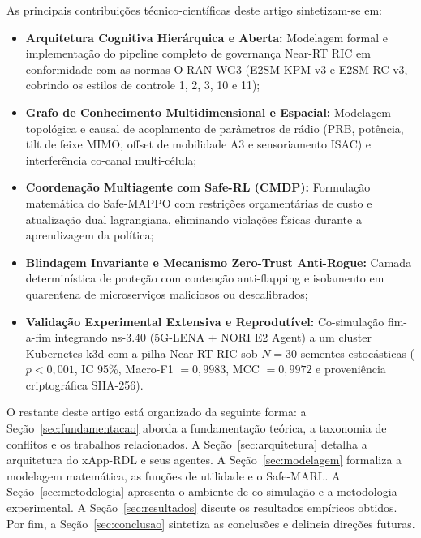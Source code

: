 \documentclass[12pt]{article}
\begin{document}
As principais contribuições técnico-científicas deste artigo sintetizam-se em:
\begin{itemize}
    \item[(i)] \textbf{Arquitetura Cognitiva Hierárquica e Aberta:} Modelagem formal e implementação do pipeline completo de governança Near-RT RIC em conformidade com as normas O-RAN WG3 (E2SM-KPM v3 e E2SM-RC v3, cobrindo os estilos de controle 1, 2, 3, 10 e 11);
    \item[(ii)] \textbf{Grafo de Conhecimento Multidimensional e Espacial:} Modelagem topológica e causal de acoplamento de parâmetros de rádio (PRB, potência, tilt de feixe MIMO, offset de mobilidade A3 e sensoriamento ISAC) e interferência co-canal multi-célula;
    \item[(iii)] \textbf{Coordenação Multiagente com Safe-RL (CMDP):} Formulação matemática do Safe-MAPPO com restrições orçamentárias de custo e atualização dual lagrangiana, eliminando violações físicas durante a aprendizagem da política;
    \item[(iv)] \textbf{Blindagem Invariante e Mecanismo Zero-Trust Anti-Rogue:} Camada determinística de proteção com contenção anti-flapping e isolamento em quarentena de microserviços maliciosos ou descalibrados;
    \item[(v)] \textbf{Validação Experimental Extensiva e Reprodutível:} Co-simulação fim-a-fim integrando ns-3.40 (5G-LENA + NORI E2 Agent) a um cluster Kubernetes k3d com a pilha Near-RT RIC sob $N=30$ sementes estocásticas ($p < 0,001$, IC 95\%, Macro-F1 $= 0,9983$, MCC $= 0,9972$ e proveniência criptográfica SHA-256).
\end{itemize}

O restante deste artigo está organizado da seguinte forma: a Seção~\ref{sec:fundamentacao} aborda a fundamentação teórica, a taxonomia de conflitos e os trabalhos relacionados. A Seção~\ref{sec:arquitetura} detalha a arquitetura do xApp-RDL e seus agentes. A Seção~\ref{sec:modelagem} formaliza a modelagem matemática, as funções de utilidade e o Safe-MARL. A Seção~\ref{sec:metodologia} apresenta o ambiente de co-simulação e a metodologia experimental. A Seção~\ref{sec:resultados} discute os resultados empíricos obtidos. Por fim, a Seção~\ref{sec:conclusao} sintetiza as conclusões e delineia direções futuras.

\end{document}
